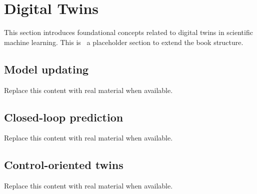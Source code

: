 \section{Digital Twins}
This section introduces foundational concepts related to digital twins in scientific machine learning. This is~\cite{abdulmaksoudTransformerBasedSensorFusion2025} a placeholder section to extend the book structure.

\subsection{Model updating}
Replace this content with real material when available.

\subsection{Closed-loop prediction}
Replace this content with real material when available.

\subsection{Control-oriented twins}
Replace this content with real material when available.
